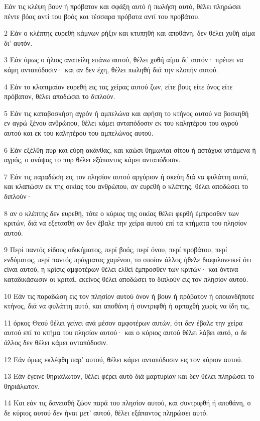 \par Εάν τις κλέψη βουν ή πρόβατον και σφάξη αυτό ή πωλήση αυτό, θέλει πληρώσει πέντε βόας αντί του βοός και τέσσαρα πρόβατα αντί του προβάτου.
\par 2 Εάν ο κλέπτης ευρεθή κάμνων ρήξιν και κτυπηθή και αποθάνη, δεν θέλει χυθή αίμα δι' αυτόν.
\par 3 Εάν όμως ο ήλιος ανατείλη επάνω αυτού, θέλει χυθή αίμα δι' αυτόν· πρέπει να κάμη ανταπόδοσιν· και αν δεν έχη, θέλει πωληθή διά την κλοπήν αυτού.
\par 4 Εάν το κλοπιμαίον ευρεθή εις τας χείρας αυτού ζων, είτε βους είτε όνος είτε πρόβατον, θέλει αποδώσει το διπλούν.
\par 5 Εάν τις καταβοσκήση αγρόν ή αμπελώνα και αφήση το κτήνος αυτού να βοσκηθή εν αγρώ ξένου ανθρώπου, θέλει κάμει ανταπόδοσιν εκ του καλητέρου του αγρού αυτού και εκ του καλητέρου του αμπελώνος αυτού.
\par 6 Εάν εξέλθη πυρ και εύρη ακάνθας, και καώσι θημωνίαι σίτου ή αστάχυα ιστάμενα ή αγρός, ο ανάψας το πυρ θέλει εξάπαντος κάμει ανταπόδοσιν.
\par 7 Εάν τις παραδώση εις τον πλησίον αυτού αργύριον ή σκεύη διά να φυλάττη αυτά, και κλαπώσιν εκ της οικίας του ανθρώπου, αν ευρεθή ο κλέπτης, θέλει αποδώσει το διπλούν·
\par 8 αν ο κλέπτης δεν ευρεθή, τότε ο κύριος της οικίας θέλει φερθή έμπροσθεν των κριτών, διά να εξετασθή αν δεν έβαλε την χείρα αυτού επί τα κτήματα του πλησίον αυτού.
\par 9 Περί παντός είδους αδικήματος, περί βοός, περί όνου, περί προβάτου, περί ενδύματος, περί παντός πράγματος χαμένου, το οποίον άλλος ήθελε διαφιλονεικεί ότι είναι αυτού, η κρίσις αμφοτέρων θέλει ελθεί έμπροσθεν των κριτών· και όντινα καταδικάσωσιν οι κριταί, εκείνος θέλει αποδώσει το διπλούν εις τον πλησίον αυτού.
\par 10 Εάν τις παραδώση εις τον πλησίον αυτού όνον ή βουν ή πρόβατον ή οποιονδήποτε κτήνος, διά να φυλάττη αυτό, και αποθάνη ή συντριφθή ή αρπαχθή χωρίς να ίδη τις,
\par 11 όρκος Θεού θέλει γείνει ανά μέσον αμφοτέρων αυτών, ότι δεν έβαλε την χείρα αυτού επί το κτήμα του πλησίον αυτού· και ο κύριος αυτού θέλει λάβει αυτό, ο δε άλλος δεν θέλει κάμει ανταπόδοσιν.
\par 12 Εάν όμως εκλέφθη παρ' αυτού, θέλει κάμει ανταπόδοσιν εις τον κύριον αυτού.
\par 13 Εάν έγεινε θηριάλωτον, θέλει φέρει αυτό διά μαρτυρίαν και δεν θέλει πληρώσει το θηριάλωτον.
\par 14 Και εάν τις δανεισθή ζώον παρά του πλησίον αυτού, και συντριφθή ή αποθάνη, ο δε κύριος αυτού δεν ήναι μετ' αυτού, θέλει εξάπαντος πληρώσει αυτό.
